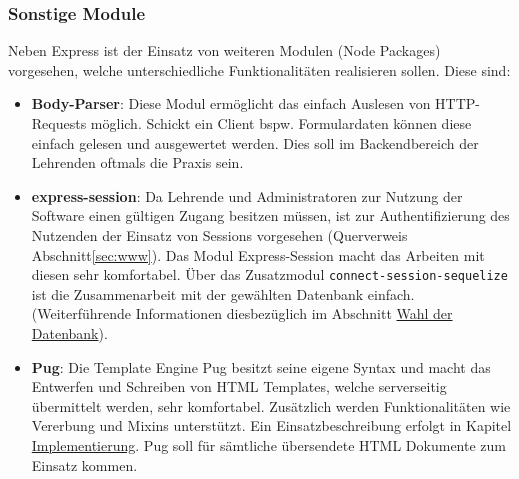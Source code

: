 \subsubsection{Sonstige Module}
Neben Express ist der Einsatz von weiteren Modulen (Node Packages) vorgesehen, welche unterschiedliche Funktionalitäten realisieren sollen. Diese sind:
\begin{itemize}
	\item \textbf{Body-Parser}: Diese Modul ermöglicht das einfach Auslesen von HTTP-Requests möglich. Schickt ein Client bspw. Formulardaten können diese einfach gelesen und ausgewertet werden. Dies soll im Backendbereich der Lehrenden oftmals die Praxis sein.
	\item \textbf{express-session}: Da Lehrende und Administratoren zur Nutzung der Software einen gültigen Zugang besitzen müssen, ist zur Authentifizierung des Nutzenden der Einsatz von Sessions vorgesehen (Querverweis Abschnitt\ref{sec:www}). Das Modul Express-Session macht das Arbeiten mit diesen sehr komfortabel. Über das Zusatzmodul \texttt{connect-session-sequelize} ist die Zusammenarbeit mit der gewählten Datenbank einfach. (Weiterführende Informationen diesbezüglich im Abschnitt \hyperref[sec:datenbank]{Wahl der Datenbank}). 
	\item \textbf{Pug}: Die Template Engine Pug besitzt seine eigene Syntax und macht das Entwerfen und Schreiben von HTML Templates, welche serverseitig übermittelt werden, sehr komfortabel. Zusätzlich werden Funktionalitäten wie Vererbung und Mixins unterstützt. Ein Einsatzbeschreibung erfolgt in Kapitel \hyperref[sec:implementierung]{Implementierung}. Pug soll für sämtliche übersendete HTML Dokumente zum Einsatz kommen.   
\end{itemize}
